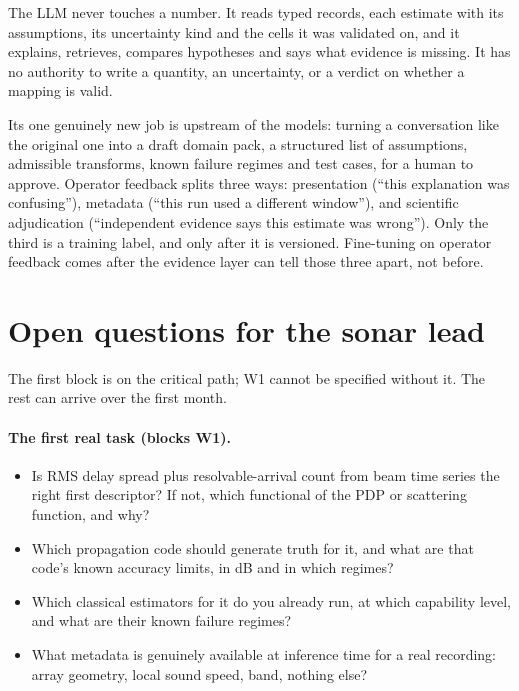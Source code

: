 \documentclass[11pt,a4paper]{article}
\begin{document}
The LLM never touches a number. It reads typed records, each estimate with its assumptions, its uncertainty kind and the cells it was validated on, and it explains, retrieves, compares hypotheses and says what evidence is missing. It has no authority to write a quantity, an uncertainty, or a verdict on whether a mapping is valid. \tagG{}

Its one genuinely new job is upstream of the models: turning a conversation like the original one into a draft domain pack, a structured list of assumptions, admissible transforms, known failure regimes and test cases, for a human to approve. Operator feedback splits three ways: presentation (``this explanation was confusing''), metadata (``this run used a different window''), and scientific adjudication (``independent evidence says this estimate was wrong''). Only the third is a training label, and only after it is versioned. Fine-tuning on operator feedback comes after the evidence layer can tell those three apart, not before.

\section{Open questions for the sonar lead}

The first block is on the critical path; W1 cannot be specified without it. The rest can arrive over the first month.

\paragraph{The first real task (blocks W1).}
\begin{itemize}
\item Is RMS delay spread plus resolvable-arrival count from beam time series the right first descriptor? If not, which functional of the PDP or scattering function, and why?
\item Which propagation code should generate truth for it, and what are that code's known accuracy limits, in dB and in which regimes?
\item Which classical estimators for it do you already run, at which capability level, and what are their known failure regimes?
\item What metadata is genuinely available at inference time for a real recording: array geometry, local sound speed, band, nothing else?
\end{itemize}
\end{document}
